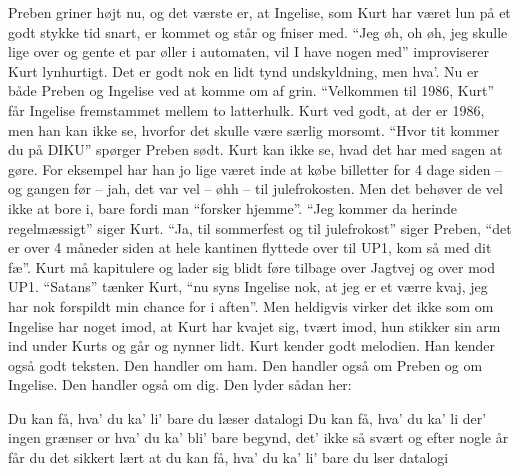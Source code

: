 \documentclass[a4paper,11pt]{article}
\begin{document}
\begin{sketch}
Preben griner højt nu, og det værste er, at Ingelise, som Kurt har været lun på
et godt stykke tid snart, er kommet og står og fniser med. ``Jeg øh, oh øh, jeg
skulle lige over og gente et par øller i automaten, vil I have nogen med''
improviserer Kurt lynhurtigt. Det er godt nok en lidt tynd undskyldning, men
hva'. Nu er både Preben og Ingelise ved at komme om af grin. ``Velkommen til
1986, Kurt'' får Ingelise fremstammet mellem to latterhulk. Kurt ved godt, at
der er 1986, men han kan ikke se, hvorfor det skulle være særlig morsomt. ``Hvor
tit kommer du på DIKU'' spørger Preben sødt. Kurt kan ikke se, hvad det har med
sagen at gøre. For eksempel har han jo lige været inde at købe billetter for 4
dage siden -- og gangen før -- jah, det var vel -- øhh -- til julefrokosten. Men
det behøver de vel ikke at bore i, bare fordi man ``forsker hjemme''. ``Jeg
kommer da herinde regelmæssigt'' siger Kurt.  ``Ja, til sommerfest og til
julefrokost'' siger Preben, ``det er over 4 måneder siden at hele kantinen
flyttede over til UP1, kom så med dit fæ''. Kurt må kapitulere og lader sig
blidt føre tilbage over Jagtvej og over mod UP1. ``Satans'' tænker Kurt, ``nu
syns Ingelise nok, at jeg er et værre kvaj, jeg har nok forspildt min chance for
i aften''. Men heldigvis virker det ikke som om Ingelise har noget imod, at Kurt
har kvajet sig, tvært imod, hun stikker sin arm ind under Kurts og går og nynner
lidt. Kurt kender godt melodien. Han kender også godt teksten. Den handler om
ham. Den handler også om Preben og om Ingelise. Den handler også om dig. Den
lyder sådan her:
\end{sketch}

\begin{song}
Du kan få, hva' du ka' li'
bare du læser datalogi
Du kan få, hva' du ka' li
der' ingen grænser or hva' du ka' bli'
bare begynd, det' ikke så svært
og efter nogle år får du det sikkert lært
at du kan få, hva' du ka' li'
bare du lser datalogi
\end{song}
\end{document}
